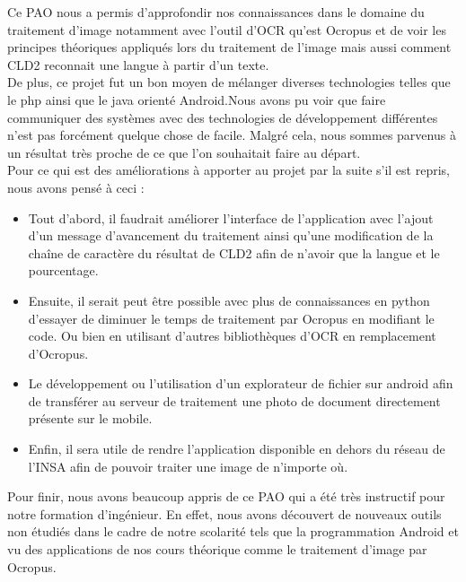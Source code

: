 Ce PAO nous a permis d'approfondir nos connaissances dans le domaine du traitement d'image notamment avec l'outil d'OCR qu'est Ocropus et de voir les principes théoriques appliqués lors du traitement de l'image mais aussi comment CLD2 reconnait une langue à partir d'un texte.\\

De plus, ce projet fut un bon moyen de mélanger diverses technologies telles que le php ainsi que le java orienté Android.Nous avons pu voir que faire communiquer des systèmes avec des technologies de développement différentes n'est pas forcément quelque chose de facile. Malgré cela, nous sommes parvenus à un résultat très proche de ce que l'on souhaitait faire au départ.\\

Pour ce qui est des améliorations à apporter au projet par la suite s'il est repris, nous avons pensé à ceci :
\begin{itemize}
 \item Tout d'abord, il faudrait améliorer l'interface de l'application avec l'ajout d'un message d'avancement du traitement ainsi qu'une modification de la chaîne de caractère du résultat de CLD2 afin de n'avoir que la langue et le pourcentage.
 \item Ensuite, il serait peut être possible avec plus de connaissances en python d'essayer de diminuer le temps de traitement par Ocropus en modifiant le code. Ou bien en utilisant d'autres bibliothèques d'OCR en remplacement d'Ocropus.
 \item Le développement ou l'utilisation d'un explorateur de fichier sur android afin de transférer au serveur de traitement une photo de document directement présente sur le mobile.
 \item Enfin, il sera utile de rendre l'application disponible en dehors du réseau de l'INSA afin de pouvoir traiter une image de n'importe où.
\end{itemize}

Pour finir, nous avons beaucoup appris de ce PAO qui a été très instructif pour notre formation d'ingénieur. En effet, nous avons découvert de nouveaux outils non étudiés dans le cadre de notre scolarité tels que la programmation Android et vu des applications de nos cours théorique comme le traitement d'image par Ocropus. 